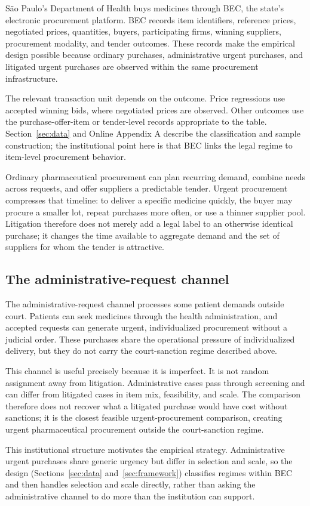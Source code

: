 S\~ao Paulo's Department of Health buys medicines through BEC, the state's electronic procurement platform. BEC records item identifiers, reference prices, negotiated prices, quantities, buyers, participating firms, winning suppliers, procurement modality, and tender outcomes. These records make the empirical design possible because ordinary purchases, administrative urgent purchases, and litigated urgent purchases are observed within the same procurement infrastructure.

The relevant transaction unit depends on the outcome. Price regressions use accepted winning bids, where negotiated prices are observed. Other outcomes use the purchase-offer-item or tender-level records appropriate to the table. Section~\ref{sec:data} and Online Appendix A describe the classification and sample construction; the institutional point here is that BEC links the legal regime to item-level procurement behavior.

Ordinary pharmaceutical procurement can plan recurring demand, combine needs across requests, and offer suppliers a predictable tender. Urgent procurement compresses that timeline: to deliver a specific medicine quickly, the buyer may procure a smaller lot, repeat purchases more often, or use a thinner supplier pool. Litigation therefore does not merely add a legal label to an otherwise identical purchase; it changes the time available to aggregate demand and the set of suppliers for whom the tender is attractive.

\subsection{The administrative-request channel}
\label{subsec:admin}

The administrative-request channel processes some patient demands outside court. Patients can seek medicines through the health administration, and accepted requests can generate urgent, individualized procurement without a judicial order. These purchases share the operational pressure of individualized delivery, but they do not carry the court-sanction regime described above.

This channel is useful precisely because it is imperfect. It is not random assignment away from litigation. Administrative cases pass through screening and can differ from litigated cases in item mix, feasibility, and scale. The comparison therefore does not recover what a litigated purchase would have cost without sanctions; it is the closest feasible urgent-procurement comparison, creating urgent pharmaceutical procurement outside the court-sanction regime.

This institutional structure motivates the empirical strategy. Administrative urgent purchases share generic urgency but differ in selection and scale, so the design (Sections~\ref{sec:data} and~\ref{sec:framework}) classifies regimes within BEC and then handles selection and scale directly, rather than asking the administrative channel to do more than the institution can support.
